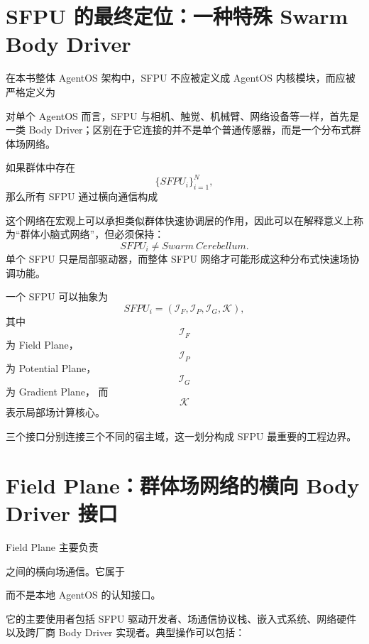 \section{SFPU 的最终定位：一种特殊 Swarm Body Driver}

在本书整体 AgentOS 架构中，SFPU 不应被定义成 AgentOS 内核模块，而应被严格定义为
\begin{statementbox}
\centering
{}
\end{statementbox}

对单个 AgentOS 而言，SFPU 与相机、触觉、机械臂、网络设备等一样，首先是一类 Body Driver；区别在于它连接的并不是单个普通传感器，而是一个分布式群体场网络。

如果群体中存在
\[
\{SFPU_i\}_{i=1}^{N},
\]
那么所有 SFPU 通过横向通信构成
\begin{statementbox}
\centering
{}
\end{statementbox}
这个网络在宏观上可以承担类似群体快速协调层的作用，因此可以在解释意义上称为“群体小脑式网络”，但必须保持：
\[
SFPU_i
\neq
Swarm\ Cerebellum.
\]
单个 SFPU 只是局部驱动器，而整体 SFPU 网络才可能形成这种分布式快速场协调功能。

一个 SFPU 可以抽象为
\[
SFPU_i
=
(
\mathcal I_F,
\mathcal I_P,
\mathcal I_G,
\mathcal K
),
\]
其中
\[
\mathcal I_F
\]
为 Field Plane，
\[
\mathcal I_P
\]
为 Potential Plane，
\[
\mathcal I_G
\]
为 Gradient Plane，
而
\[
\mathcal K
\]
表示局部场计算核心。

三个接口分别连接三个不同的宿主域，这一划分构成 SFPU 最重要的工程边界。


\section{Field Plane：群体场网络的横向 Body Driver 接口}

Field Plane 主要负责
\begin{statementbox}
\centering
{}
\end{statementbox}
之间的横向场通信。它属于
\begin{statementbox}
\centering
{}
\end{statementbox}
而不是本地 AgentOS 的认知接口。

它的主要使用者包括 SFPU 驱动开发者、场通信协议栈、嵌入式系统、网络硬件以及跨厂商 Body Driver 实现者。典型操作可以包括：

